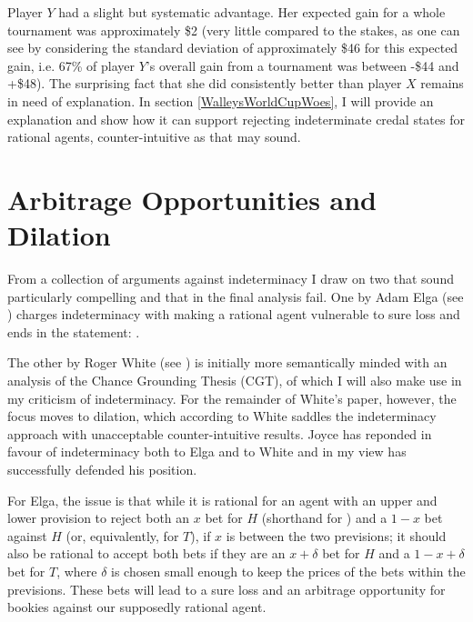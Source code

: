 Player $Y$ had a slight but systematic advantage. Her expected gain for a whole tournament was approximately \$2 (very little compared to the stakes, as one can see by considering the standard deviation of approximately \$46 for this expected gain, i.e. 67\% of player $Y$'s overall gain from a tournament was between -\$44 and +\$48). The surprising fact that she did consistently better than player $X$ remains in need of explanation. In section \ref{WalleysWorldCupWoes}, I will provide an explanation and show how it can support rejecting indeterminate credal states for rational agents, counter-intuitive as that may sound.

\section{Arbitrage Opportunities and Dilation}
\label{ArbitrageOpportunitiesAndDilation}

From a collection of arguments against indeterminacy I draw on two that sound particularly compelling and that in the final analysis fail. One by Adam Elga (see ) charges indeterminacy with making a rational agent vulnerable to sure loss and ends in the statement:  .

The other by Roger White (see ) is initially more semantically minded with an analysis of the Chance Grounding Thesis (CGT), of which I will also make use in my criticism of indeterminacy. For the remainder of White's paper, however, the focus moves to dilation, which according to White saddles the indeterminacy approach with unacceptable counter-intuitive results. Joyce has reponded in favour of indeterminacy both to Elga and to White and in my view has successfully defended his position.

For Elga, the issue is that while it is rational for an agent with an upper and lower provision to reject both an $x$ bet for $H$ (shorthand for ) and a $1-x$ bet against $H$ (or, equivalently, for $T$), if $x$ is between the two previsions; it should also be rational to accept both bets if they are an $x+\delta$ bet for $H$ and a $1-x+\delta$ bet for $T$, where $\delta$ is chosen small enough to keep the prices of the bets within the previsions. These bets will lead to a sure loss and an arbitrage opportunity for bookies against our supposedly rational agent.


